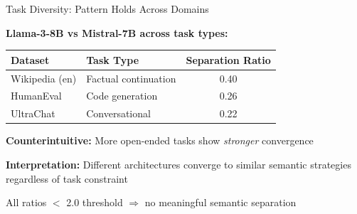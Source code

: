 \documentclass[aspectratio=169,11pt]{beamer}
\begin{document}
\begin{frame}{Task Diversity: Pattern Holds Across Domains}

\textbf{Llama-3-8B vs Mistral-7B across task types:}

\vspace{0.5em}

\begin{center}
\begin{tabular}{llc}
\toprule
\textbf{Dataset} & \textbf{Task Type} & \textbf{Separation Ratio} \\
\midrule
Wikipedia (en) & Factual continuation & 0.40 \\
HumanEval & Code generation & 0.26 \\
UltraChat & Conversational & 0.22 \\
\bottomrule
\end{tabular}
\end{center}

\vspace{1em}

\textbf{Counterintuitive:} More open-ended tasks show \emph{stronger} convergence

\vspace{0.5em}

\textbf{Interpretation:} Different architectures converge to similar semantic strategies regardless of task constraint

\vspace{0.5em}

All ratios $<$ 2.0 threshold $\Rightarrow$ no meaningful semantic separation

\end{frame}
\end{document}
